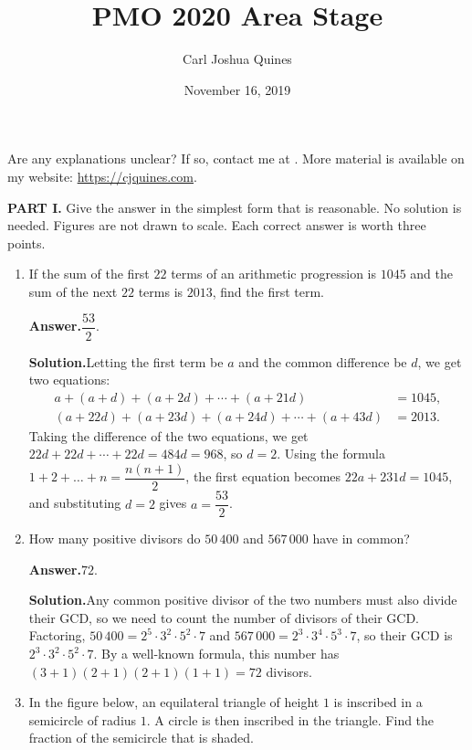 \documentclass[11pt,paper=letter]{scrartcl}
\newcommand{\ans}{{\sffamily \bfseries Answer.}\;}
\newcommand{\sol}{{\sffamily \bfseries Solution.}\;}
\begin{document}
\title{PMO 2020 Area Stage}
\author{Carl Joshua Quines}
\date{November 16, 2019}

\maketitle

Are any explanations unclear? If so, contact me at . More material is available on my website: \url{https://cjquines.com}.

\textbf{PART I.} Give the answer in the simplest form that is reasonable. No solution is needed. Figures are not drawn to scale. Each correct answer is worth three points.

\begin{enumerate}[left=0pt]

\item If the sum of the first $22$ terms of an arithmetic progression is $1045$ and the sum of the next $22$ terms is $2013$, find the first term.

\ans $\boxed{\dfrac{53}{2}}$.

\sol Letting the first term be $a$ and the common difference be $d$, we get two equations:
\begin{align*}
a + (a + d) + (a + 2d) + \cdots + (a + 21d) &= 1045, \\
(a + 22d) + (a + 23d) + (a + 24d) + \cdots + (a + 43d) &= 2013.
\end{align*}
Taking the difference of the two equations, we get $22d + 22d + \cdots + 22d = 484d = 968$, so $d = 2$. Using the formula $1 + 2 + \ldots + n = \dfrac{n(n+1)}{2}$, the first equation becomes $22a + 231d = 1045$, and substituting $d = 2$ gives $a = \dfrac{53}{2}$.

\item How many positive divisors do $50\,400$ and $567\,000$ have in common?

\ans $\boxed{72}$.

\sol Any common positive divisor of the two numbers must also divide their GCD, so we need to count the number of divisors of their GCD. Factoring, $50\,400 = 2^5 \cdot 3^2 \cdot 5^2 \cdot 7$ and $567\,000 = 2^3 \cdot 3^4 \cdot 5^3 \cdot 7$, so their GCD is $2^3 \cdot 3^2 \cdot 5^2 \cdot 7$. By a well-known formula, this number has $(3 + 1)(2 + 1)(2 + 1)(1 + 1) = 72$ divisors.

\item In the figure below, an equilateral triangle of height $1$ is inscribed in a semicircle of radius $1$. A circle is then inscribed in the triangle. Find the fraction of the semicircle that is shaded.


\end{enumerate}
\end{document}
